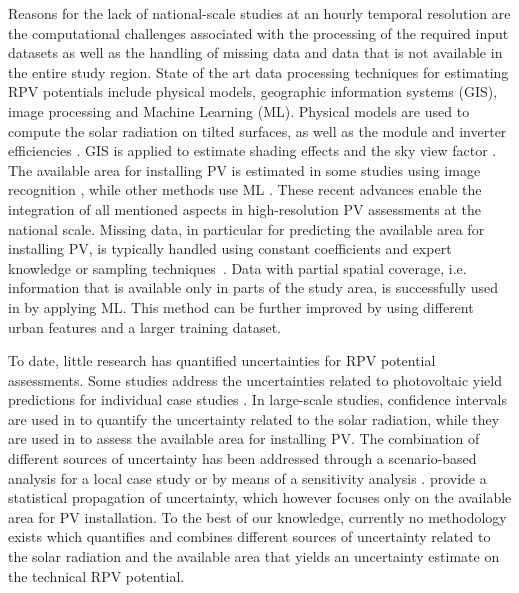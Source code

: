 Reasons for the lack of national-scale studies at an hourly temporal resolution are the computational challenges associated with the processing of the required input datasets as well as
the handling of missing data and data that is not available in the entire study region.
State of the art data processing techniques for estimating RPV potentials include physical models, geographic information systems (GIS), image processing and Machine Learning (ML). 
Physical models are used to compute the solar radiation on tilted surfaces, as well as the module and inverter efficiencies \cite{ramirez_camargo_spatio-temporal_2015}. 
GIS is applied to estimate shading effects and the sky view factor \cite{klauser_solarpotentialanalyse_2016, desthieux_solar_2018}.
The available area for installing PV is estimated in some studies using image recognition \cite{mainzer_assessment_2017, palmer_gis-based_2018}, while other methods use ML \cite{assouline_quantifying_2017, assouline_large-scale_2018}. 
These recent advances enable the integration of all mentioned aspects in high-resolution PV assessments at the national scale.
%
Missing data, in particular for predicting the available area for installing PV, is typically handled using constant coefficients and expert knowledge \cite{iea_potential_2002} or sampling techniques~\cite{wiginton_quantifying_2010}. Data with partial spatial coverage, i.e. information that is available only in parts of the study area, is successfully used in \cite{assouline_quantifying_2017, assouline_large-scale_2018} by applying ML. 
This method can be further improved by using different urban features and a larger training dataset.

To date, little research has quantified uncertainties for RPV potential assessments. Some studies address the uncertainties related to photovoltaic yield predictions for individual case studies \cite{thevenard_estimating_2013, gueymard_direct_2009}. In large-scale studies, confidence intervals are used in \cite{buffat_scalable_2018} to quantify the uncertainty related to the solar radiation, while they are used in \cite{assouline_large-scale_2018} to assess the available area for installing PV. 
The combination of different sources of uncertainty has been addressed through a scenario-based analysis for a local case study \cite{kreifels_uncertainty_2016} or by means of a sensitivity analysis \cite{martins_sensitivity_2016}. \citet{izquierdo_method_2008} provide a statistical propagation of uncertainty, which however focuses only on the available area for PV installation.
To the best of our knowledge, currently no methodology exists which quantifies and combines different sources of uncertainty related to the solar radiation and the available area that yields an uncertainty estimate on the technical RPV potential.

